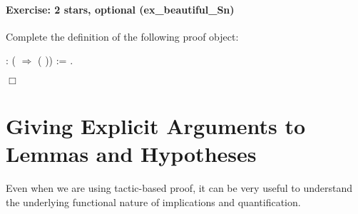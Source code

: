 \documentclass[12pt]{report}
\begin{document}
\paragraph{Exercise: 2 stars, optional (ex\_beautiful\_Sn)}

 Complete the definition of the following proof object: \begin{coqdoccode}
\coqdocemptyline
\coqdocnoindent
{}  :  \coqdocvar{\_} (  \ensuremath{\Rightarrow}  ( )) :=\coqdoceol
\coqdocnoindent
 .\coqdoceol
\end{coqdoccode}
\ensuremath{\Box} \begin{coqdoccode}
\coqdocemptyline
\end{coqdoccode}
\section{Giving Explicit Arguments to Lemmas and Hypotheses}



 Even when we are using tactic-based proof, it can be very useful to
understand the underlying functional nature of implications and quantification. 
\end{document}
